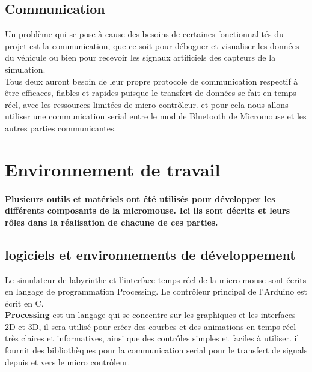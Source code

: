 \subsection{Communication} \label{sec:mapMaze}
Un problème qui se pose à cause des besoins de certaines fonctionnalités du
projet est la communication, que ce soit pour déboguer et visualiser les
données du véhicule ou bien pour recevoir les signaux artificiels des capteurs
de la simulation. \\

Tous deux auront besoin de leur propre protocole de communication respectif
à être efficaces, fiables et rapides puisque le transfert de données se fait en
temps réel, avec les ressources limitées de micro contrôleur. et pour cela nous
allons utiliser une communication serial entre le module Bluetooth de Micromouse
et les autres parties communicantes.

\section{Environnement de travail} \label{sec:environnement}

\paragraph{ 
   Plusieurs outils et matériels ont été utilisés pour développer les
différents composants de la micromouse. Ici ils sont décrits et leurs rôles
dans la réalisation de chacune de ces parties.}

\subsection{logiciels et environnements de développement} \label{subsec:softDev} 

   Le simulateur de labyrinthe et l'interface temps réel de la micro mouse sont
écrits en langage de programmation Processing. Le contrôleur principal de
l'Arduino est écrit en C. \\


   \textbf{Processing} est un langage qui se concentre sur les graphiques et
les interfaces 2D et 3D, il sera utilisé pour créer des courbes et des
animations en temps réel très claires et informatives, ainsi que des
contrôles simples et faciles à utiliser. il fournit des bibliothèques pour
la communication serial pour le transfert de signals depuis et vers le micro
contrôleur. \\

